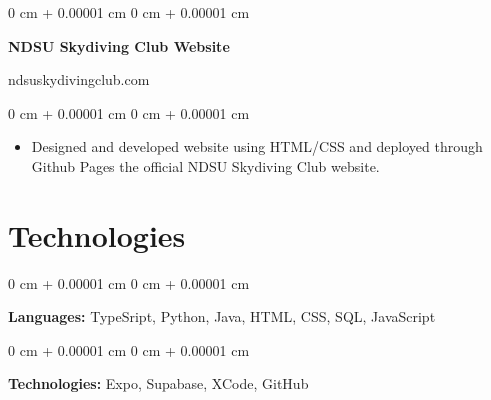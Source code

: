 \documentclass[10pt, letterpaper]{article}
\newenvironment{highlights}{
    \begin{itemize}[
        topsep=0.10 cm,
        parsep=0.10 cm,
        partopsep=0pt,
        itemsep=0pt,
        leftmargin=0 cm + 20pt
    ]
}{
    \end{itemize}
} %
\newenvironment{onecolentry}{
    \begin{adjustwidth}{
        0 cm + 0.00001 cm
    }{
        0 cm + 0.00001 cm
    }
}{
    \end{adjustwidth}
} %
\newenvironment{twocolentry}[2][]{
    \onecolentry
    \def\secondColumn{#2}
    \setcolumnwidth{\fill, 4.5 cm}
    \begin{paracol}{2}
}{
    \switchcolumn \raggedleft \secondColumn
    \end{paracol}
    \endonecolentry
} %
\begin{document}
    \vspace{0.2 cm}

    \begin{twocolentry}{
        ndsuskydivingclub.com
    }
        \textbf{NDSU Skydiving Club Website}
    \end{twocolentry}

    \vspace{0.10 cm}
    \begin{onecolentry}
        \begin{highlights}
            \item Designed and developed website using HTML/CSS and deployed through Github Pages the official NDSU Skydiving Club website.
        \end{highlights}
    \end{onecolentry}

    \section{Technologies}

    \begin{onecolentry}
        \textbf{Languages:} TypeSript, Python, Java, HTML, CSS, SQL, JavaScript
    \end{onecolentry}

    \vspace{0.2 cm}

    \begin{onecolentry}
        \textbf{Technologies:} Expo, Supabase, XCode, GitHub
    \end{onecolentry}
\end{document}
